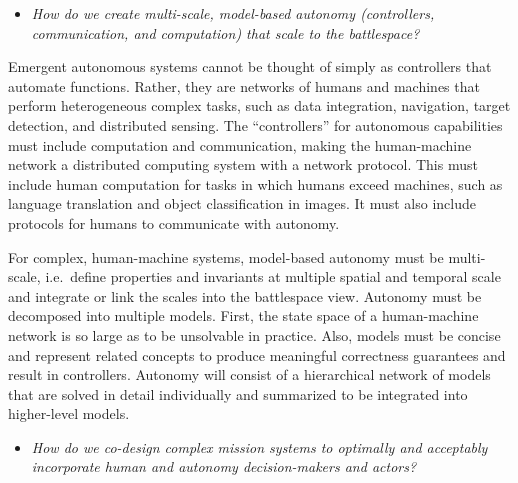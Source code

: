 
\begin{itemize}
\item {\em How do we create multi-scale, model-based autonomy (controllers, communication, and computation) that scale to the battlespace?}
\end{itemize}

Emergent autonomous systems cannot be thought of simply as controllers that automate functions.  Rather, they are networks of humans and machines that
perform heterogeneous complex tasks, such as data integration, navigation, target detection, and distributed sensing.  The ``controllers'' for 
autonomous capabilities must include computation and communication, making the human-machine network a distributed computing system with a 
network protocol.  This must include human computation for tasks in which humans exceed machines, such as language translation and 
object classification in images.  It must also include protocols for humans to communicate with autonomy. 

For complex, human-machine systems, model-based autonomy must be multi-scale, i.e.~define properties and invariants at multiple spatial and temporal scale
and integrate or link the scales into the battlespace view.  Autonomy must be decomposed into multiple models.  First, 
the state space of a human-machine network is so large as to be unsolvable in practice.  
Also, models must be concise and represent related concepts to produce meaningful correctness guarantees and result in controllers.
Autonomy will consist of a hierarchical network of models that are solved in detail individually and summarized to be integrated
into higher-level models.

\begin{itemize}
\item {\em How do we co-design complex mission systems to optimally and acceptably incorporate human and autonomy decision-makers and actors?}
\end{itemize}




